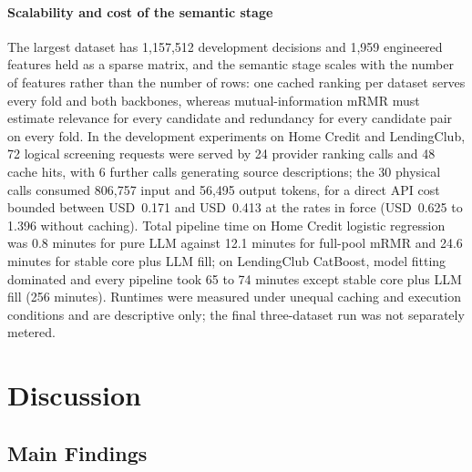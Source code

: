 \documentclass[final,5p,twocolumn]{elsarticle}
\begin{document}
\paragraph{Scalability and cost of the semantic stage}
The largest dataset has 1,157,512 development decisions and 1,959 engineered features held as a sparse matrix, and the semantic stage scales with the number of features rather than the number of rows: one cached ranking per dataset serves every fold and both backbones, whereas mutual-information mRMR must estimate relevance for every candidate and redundancy for every candidate pair on every fold. In the development experiments on Home Credit and LendingClub, 72 logical screening requests were served by 24 provider ranking calls and 48 cache hits, with 6 further calls generating source descriptions; the 30 physical calls consumed 806,757 input and 56,495 output tokens, for a direct API cost bounded between USD~0.171 and USD~0.413 at the rates in force (USD~0.625 to 1.396 without caching). Total pipeline time on Home Credit logistic regression was 0.8 minutes for pure LLM against 12.1 minutes for full-pool mRMR and 24.6 minutes for stable core plus LLM fill; on LendingClub CatBoost, model fitting dominated and every pipeline took 65 to 74 minutes except stable core plus LLM fill (256 minutes). Runtimes were measured under unequal caching and execution conditions and are descriptive only; the final three-dataset run was not separately metered.


\section{Discussion}
\label{sec:discussion}

\subsection{Main Findings}
\label{subsec:main_findings}
\end{document}
